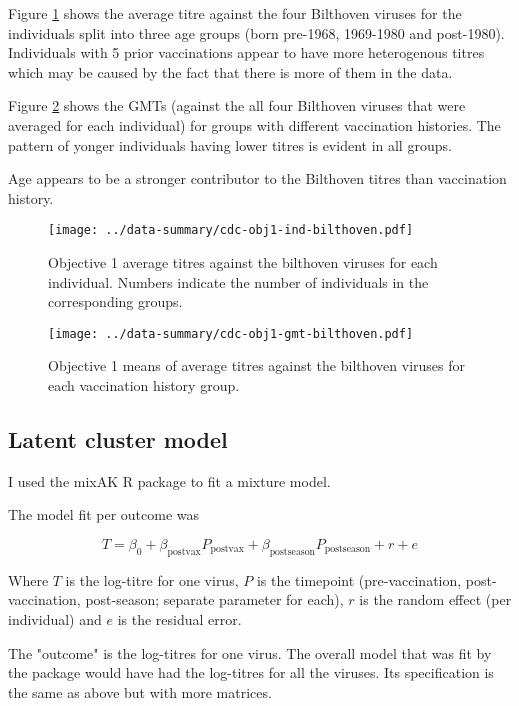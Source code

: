 \documentclass[12pt]{article}
\begin{document}
Figure \ref{fig:cdc-obj1-ind-bilthoven} shows the average titre against the four Bilthoven viruses for
the individuals split into three age groups (born pre-1968, 1969-1980 and post-1980). Individuals with 5 prior vaccinations appear to have more heterogenous titres which may be caused by the fact that there is more of them in the data.

Figure \ref{fig:cdc-obj1-gmt-bilthoven} shows the GMTs (against the all four Bilthoven viruses that were averaged for each individual) for groups with different vaccination histories. The pattern of yonger individuals having lower titres is evident in all groups.

Age appears to be a stronger contributor to the Bilthoven titres than vaccination history.

\begin{figure}
	\texttt{[image: ../data-summary/cdc-obj1-ind-bilthoven.pdf]}
	\caption{Objective 1 average titres against the bilthoven viruses for each individual. Numbers indicate the number of individuals in the corresponding groups.}
	\label{fig:cdc-obj1-ind-bilthoven}
\end{figure}

\begin{figure}
	\texttt{[image: ../data-summary/cdc-obj1-gmt-bilthoven.pdf]}
	\caption{Objective 1 means of average titres against the bilthoven viruses for each vaccination history group. }
	\label{fig:cdc-obj1-gmt-bilthoven}
\end{figure}

\subsection{Latent cluster model}

I used the mixAK R package to fit a mixture model.

The model fit per outcome was

$$
	T = \beta_0 + \beta_{\text{postvax}}P_{\text{postvax}} + \beta_{\text{postseason}}P_{\text{postseason}} + r + e
$$

Where $T$ is the log-titre for one virus, $P$ is the timepoint (pre-vaccination, post-vaccination, post-season; separate parameter for each), $r$ is the random effect (per individual) and $e$ is the residual error.

The "outcome" is the log-titres for one virus. The overall model that was fit by the package would have had the log-titres for all the viruses. Its specification is the same as above but with more matrices.
\end{document}
